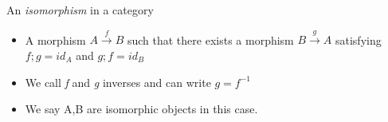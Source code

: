 An \emph{isomorphism} in a category

\begin{itemize}
    \item A morphism $A \xrightarrow{f}B$ such that there exists a morphism $B \xrightarrow{g}A$ satisfying $f;g=id_A$ and $g;f=id_B$
    \item We call \emph{f} and \emph{g} inverses and can write $g=f^{-1}$
    \item We say A,B are isomorphic objects in this case.
\end{itemize}

